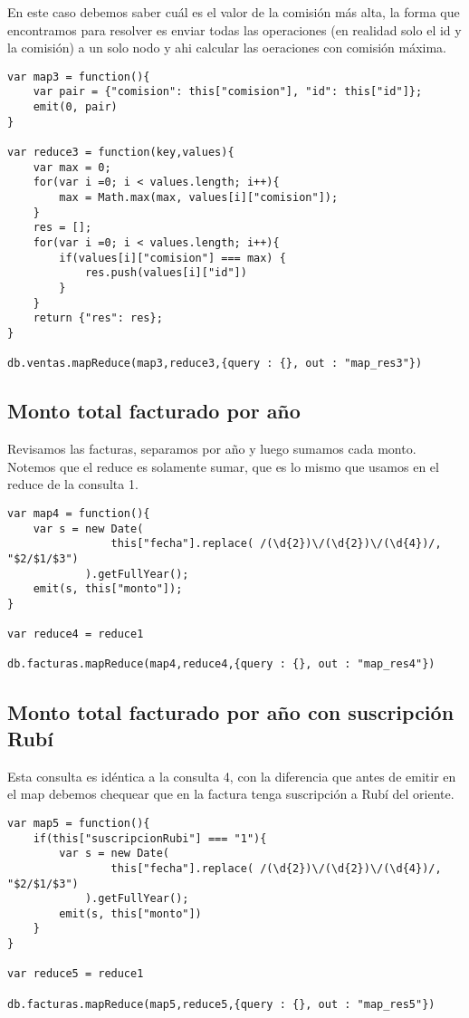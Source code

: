 En este caso debemos saber cuál es el valor de la comisión más alta, la forma que encontramos para resolver es enviar todas las operaciones (en realidad solo el id y la comisión) a un solo nodo y ahi calcular las oeraciones con comisión máxima.

\begin{verbatim}
var map3 = function(){
    var pair = {"comision": this["comision"], "id": this["id"]};
    emit(0, pair)
}

var reduce3 = function(key,values){
    var max = 0;
    for(var i =0; i < values.length; i++){
        max = Math.max(max, values[i]["comision"]);
    }
    res = [];
    for(var i =0; i < values.length; i++){
        if(values[i]["comision"] === max) {
            res.push(values[i]["id"])
        }
    }	
    return {"res": res};
}

db.ventas.mapReduce(map3,reduce3,{query : {}, out : "map_res3"})
\end{verbatim}

\subsection{Monto total facturado por año}

Revisamos las facturas, separamos por año y luego sumamos cada monto. Notemos que el reduce es solamente sumar, que es lo mismo que usamos en el reduce de la consulta 1.

\begin{verbatim}
var map4 = function(){
    var s = new Date(
                this["fecha"].replace( /(\d{2})\/(\d{2})\/(\d{4})/, "$2/$1/$3")
            ).getFullYear();
    emit(s, this["monto"]);
}

var reduce4 = reduce1

db.facturas.mapReduce(map4,reduce4,{query : {}, out : "map_res4"})
\end{verbatim}

\subsection{Monto total facturado por año con suscripción Rubí}

Esta consulta es idéntica a la consulta 4, con la diferencia que antes de emitir en el map debemos chequear que en la factura tenga suscripción a Rubí del oriente.

\begin{verbatim}
var map5 = function(){
    if(this["suscripcionRubi"] === "1"){
        var s = new Date(
                this["fecha"].replace( /(\d{2})\/(\d{2})\/(\d{4})/, "$2/$1/$3")
            ).getFullYear();
        emit(s, this["monto"])		
    }
}

var reduce5 = reduce1

db.facturas.mapReduce(map5,reduce5,{query : {}, out : "map_res5"})
\end{verbatim}

